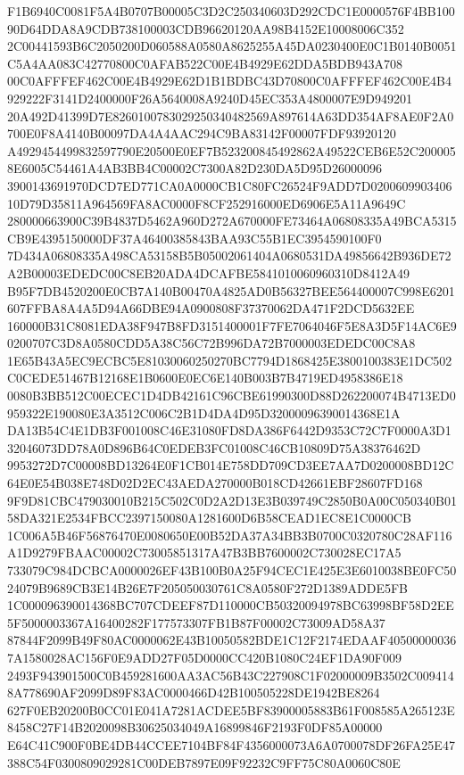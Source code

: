 \documentclass[UTF8,fontset=fandol,zihao=-4,a4paper]{ctexart}
\begin{document}
{{F1B6940C0081F5A4B0707B00005C3D2C250340603D292CDC1E0000576F4BB10090D64DDA8A9CDB738100003CDB96620120AA98B4152E10008006C352
2C00441593B6C2050200D060588A0580A8625255A45DA0230400E0C1B0140B0051C5A4AA083C42770800C0AFAB522C00E4B4929E62DDA5BDB943A708
00C0AFFFEF462C00E4B4929E62D1B1BDBC43D70800C0AFFFEF462C00E4B4929222F3141D2400000F26A5640008A9240D45EC353A4800007E9D949201
20A492D41399D7E8260100783029250340482569A897614A63DD354AF8AE0F2A0700E0F8A4140B00097DA4A4AAC294C9BA83142F00007FDF93920120
A4929454499832597790E20500E0EF7B523200845492862A49522CEB6E52C2000058E6005C54461A4AB3BB4C00002C7300A82D230DA5D95D26000096
3900143691970DCD7ED771CA0A0000CB1C80FC26524F9ADD7D020060990340610D79D35811A964569FA8AC0000F8CF252916000ED6906E5A11A9649C
280000663900C39B4837D5462A960D272A670000FE73464A06808335A49BCA5315CB9E4395150000DF37A46400385843BAA93C55B1EC3954590100F0
7D434A06808335A498CA53158B5B05002061404A0680531DA49856642B936DE72A2B00003EDEDC00C8EB20ADA4DCAFBE5841010060960310D8412A49
B95F7DB4520200E0CB7A140B00470A4825AD0B56327BEE564400007C998E6201607FFBA8A4A5D94A66DBE94A0900808F37370062DA471F2DCD5632EE
160000B31C8081EDA38F947B8FD3151400001F7FE7064046F5E8A3D5F14AC6E90200707C3D8A0580CDD5A38C56C72B996DA72B7000003EDEDC00C8A8
1E65B43A5EC9ECBC5E81030060250270BC7794D1868425E3800100383E1DC502C0CEDE51467B12168E1B0600E0EC6E140B003B7B4719ED4958386E18
0080B3BB512C00ECEC1D4DB42161C96CBE61990300D88D262200074B4713ED0959322E190080E3A3512C006C2B1D4DA4D95D32000096390014368E1A
DA13B54C4E1DB3F001008C46E31080FD8DA386F6442D9353C72C7F0000A3D132046073DD78A0D896B64C0EDEB3FC01008C46CB10809D75A38376462D
9953272D7C00008BD13264E0F1CB014E758DD709CD3EE7AA7D0200008BD12C64E0E54B038E748D02D2EC43AEDA270000B018CD42661EBF28607FD168
9F9D81CBC479030010B215C502C0D2A2D13E3B039749C2850B0A00C050340B0158DA321E2534FBCC2397150080A1281600D6B58CEAD1EC8E1C0000CB
1C006A5B46F56876470E0080650E00B52DA37A34BB3B0700C0320780C28AF116A1D9279FBAAC00002C73005851317A47B3BB7600002C730028EC17A5
733079C984DCBCA0000026EF43B100B0A25F94CEC1E425E3E6010038BE0FC5024079B9689CB3E14B26E7F205050030761C8A0580F272D1389ADDE5FB
1C000096390014368BC707CDEEF87D110000CB50320094978BC63998BF58D2EE5F5000003367A16400282F177573307FB1B87F00002C73009AD58A37
87844F2099B49F80AC0000062E43B10050582BDE1C12F2174EDAAF405000000367A1580028AC156F0E9ADD27F05D0000CC420B1080C24EF1DA90F009
2493F943901500C0B459281600AA3AC56B43C227908C1F02000009B3502C0094148A778690AF2099D89F83AC0000466D42B100505228DE1942BE8264
627F0EB20200B0CC01E041A7281ACDEE5BF83900005883B61F008585A265123E8458C27F14B2020098B30625034049A16899846F2193F0DF85A00000
E64C41C900F0BE4DB44CCEE7104BF84F4356000073A6A0700078DF26FA25E47388C54F0300809029281C00DEB7897E09F92232C9FF75C80A0060C80E
}}
\end{document}
